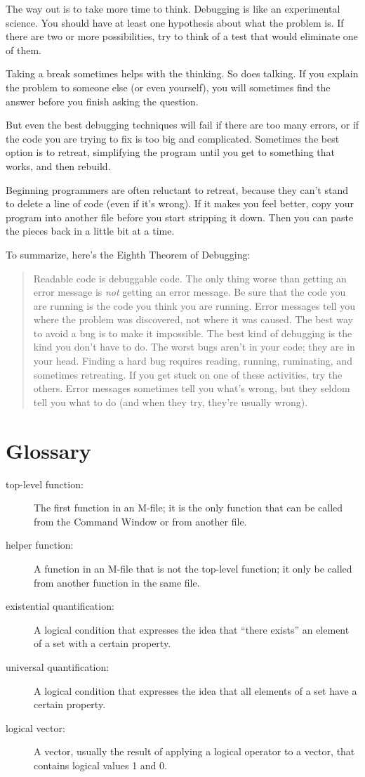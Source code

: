 \documentclass[
]{book}
\numberwithin{Answer}{chapter}
\numberwithin{Exercise}{chapter}
\newcommand{\displaythrm}[1]{%
    \ifthenelse{\equal{#1}{1}}%
        {Readable code is debuggable code.}{%
    \ifthenelse{\equal{#1}{2}}%
        {The only thing worse than getting an error message is {\em
         not} getting an error message.}{%
    \ifthenelse{\equal{#1}{3}}%
        {Be sure that the code you are running
         is the code you think you are running.}{%
    \ifthenelse{\equal{#1}{4}}%
        {Error messages tell you where the problem was discovered,
         not where it was caused.}{%
    \ifthenelse{\equal{#1}{5}}%
        {The best way to avoid a bug is to make it impossible.}{%
    \ifthenelse{\equal{#1}{6}}%
        {The best kind of debugging is the kind you don't have to do.}{%
    \ifthenelse{\equal{#1}{7}}%
        {The worst bugs aren't in your code; they are in your head.}{%
    \ifthenelse{\equal{#1}{8}}%
        {Finding a hard bug requires reading, running, ruminating,
         and sometimes retreating.  If you get stuck on one of these
         activities, try the others.}{%
    \ifthenelse{\equal{#1}{9}}%
        {Error messages sometimes tell you what's wrong, but they
         seldom tell you what to do (and when they try, they're usually
         wrong).}{%
    {}%
}}}}}}}}}}%
\begin{document}
The way out is to take more time to think.  Debugging is like an
experimental science.  You should have at least one hypothesis about
what the problem is.  If there are two or more possibilities, try to
think of a test that would eliminate one of them.

Taking a break sometimes helps with the thinking.  So does talking.
If you explain the problem to someone else (or even yourself), you
will sometimes find the answer before you finish asking the question.

But even the best debugging techniques will fail if there are too many
errors, or if the code you are trying to fix is too big and
complicated.  Sometimes the best option is to retreat, simplifying the
program until you get to something that works, and then rebuild.

Beginning programmers are often reluctant to retreat, because
they can't stand to delete a line of code (even if it's wrong).
If it makes you feel better, copy your program into another file
before you start stripping it down.  Then you can paste the pieces
back in a little bit at a time.


To summarize, here's the Eighth Theorem of Debugging:

\begin{quote}
\displaythrm{8}
\end{quote}


\section{Glossary}

\begin{description}

\item[top-level function:]  The first function in an M-file;
it is the only function that can be called from the Command
Window or from another file.

\item[helper function:] A function in an M-file that is not
the top-level function; it only be called from another function
in the same file.

\item[existential quantification:] A logical condition that expresses
the idea that ``there exists'' an element of a set with a certain
property.

\item[universal quantification:] A logical condition that expresses
the idea that all elements of a set have a certain property.

\item[logical vector:] A vector, usually the result of applying a logical
operator to a vector, that contains logical values 1 and 0.


\end{description}
\end{document}
